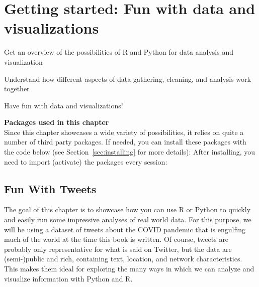 \chapter{Getting started: Fun with data and visualizations}
\label{chap:fundata}

\begin{abstract}{Abstract}
  This chapter is a lightning tour of some of the cool (and informative) things you can do with R and Python.
  Starting from a dataset of tweets about COVID-19, we show how you can analyze this data using
  text analysis, network analysis, and using geographic information.
  The goal of this chapter is not to teach you all these techniques in detail,
  rather, each of the examples showcases a possibility and guides you to the chapter where it will be explained in more detail.
  So don't worry too much about understanding every line of code, but relax and enjoy the ride!
\end{abstract}


\begin{objectives}
\item Get an overview of the possibilities of R and Python for data analysis and visualization
\item Understand how different aspects of data gathering, cleaning, and analysis work together
\item Have fun with data and visualizations!
\end{objectives}

\newpage
\begin{feature}
  \textbf{Packages used in this chapter}\\
  Since this chapter showcases a wide variety of possibilities,
  it relies on quite a number of third party packages.
  If needed, you can install these packages with the code below
  (see Section~\ref{sec:installing} for more details):
  \noindent After installing, you need to import (activate) the packages every session:
\end{feature}


%
\section{Fun With Tweets}

The goal of this chapter is to showcase how you can use R or Python to quickly and easily
run some impressive analyses of real world data.
For this purpose, we will be using a dataset of tweets about the COVID pandemic that is
engulfing much of the world at the time this book is written.
Of course, tweets are probably only representative for what is said on Twitter,
but the data are (semi-)public and rich, containing text, location, and network characteristics.
This makes them ideal for exploring the many ways in which we can analyze and visualize information
with Python and R. 

